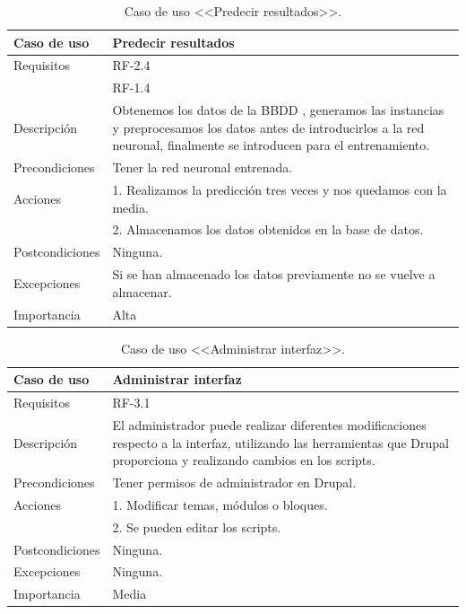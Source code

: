\begin{table}
  \begin{center}
   \begin{tabular}{|p{3cm} | p{9cm} |}
    \hline
    Caso de uso & Predecir resultados\\
    \hline
    Requisitos & RF-2.4\\
	    & RF-1.4\\
    \hline
    Descripción & Obtenemos los datos de la BBDD , generamos las instancias y preprocesamos los datos antes de introducirlos a la red neuronal, finalmente se introducen para el entrenamiento.\\
    \hline
    Precondiciones &Tener la red neuronal entrenada.\\
    \hline
  	Acciones & 1. Realizamos la predicción tres veces y nos quedamos con la media.\\
    &2. Almacenamos los datos obtenidos en la base de datos.\\
    \hline
    Postcondiciones & Ninguna. \\
    \hline
    Excepciones & Si se han almacenado los datos previamente no se vuelve a almacenar.\\
    \hline
    Importancia & Alta\\
    \hline
   \end{tabular}
   \caption{Caso de uso <<Predecir resultados>>.}
   \label{tabla:casoUso2.2}
  \end{center}
 \end{table} 
 
 \begin{table}
  \begin{center}
   \begin{tabular}{|p{3cm} | p{9cm} |}
    \hline
    Caso de uso & Administrar interfaz\\
    \hline
    Requisitos & RF-3.1\\
    \hline
    Descripción & El administrador puede realizar diferentes modificaciones respecto a la interfaz, utilizando las herramientas que Drupal proporciona y realizando cambios en los scripts.\\
    \hline
    Precondiciones &Tener permisos de administrador en Drupal.\\
    \hline
  	Acciones & 1. Modificar temas, módulos o bloques.\\
    &2. Se pueden editar los scripts.\\
    \hline
    Postcondiciones & Ninguna. \\
    \hline
    Excepciones & Ninguna.\\
    \hline
    Importancia & Media\\
    \hline
   \end{tabular}
   \caption{Caso de uso <<Administrar interfaz>>.}
   \label{tabla:casoUso3.1}
  \end{center}
 \end{table} 
 
